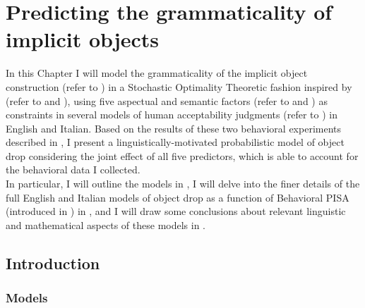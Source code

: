 \setchapterpreamble[u]{\margintoc}
\chapter{Predicting the grammaticality of implicit objects}

In this Chapter I will model the grammaticality of the implicit object construction (refer to ) in a Stochastic Optimality Theoretic fashion inspired by \textcite{Medina2007} (refer to  and ), using five aspectual and semantic factors (refer to  and ) as constraints in several models of human acceptability judgments (refer to ) in English and Italian. Based on the results of these two behavioral experiments described in , I present a linguistically-motivated probabilistic model of object drop considering the joint effect of all five predictors, which is able to account for the behavioral data I collected.\\
In particular, I will outline the models in , I will delve into the finer details of the full English and Italian models of object drop as a function of Behavioral PISA (introduced in ) in , and I will draw some conclusions about relevant linguistic and mathematical aspects of these models in .

\section{Introduction} 

\subsection{Models} 

